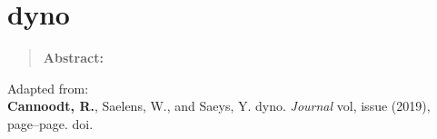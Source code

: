 \newpage{\thispagestyle{empty}\cleardoublepage}
\chapter{dyno} 
\label{chap:dyno}

\begin{quote}
	\textbf{Abstract:} \blindtext
\end{quote}

\vfill

Adapted from:\\
\textbf{Cannoodt, R.}, Saelens, W., and Saeys, Y. dyno. \textit{Journal} vol, issue (2019), page--page. doi.
\newpage

\blindtext